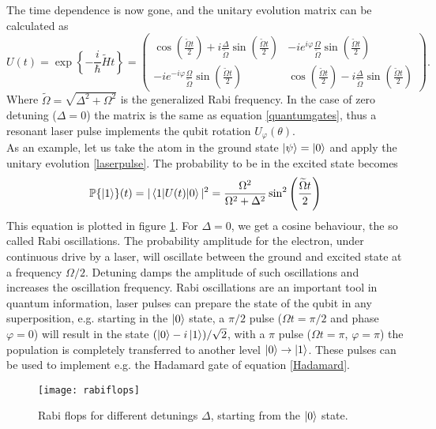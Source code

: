 The time dependence is now gone, and the unitary evolution matrix can be calculated as
\begin{equation}
\label{laserpulse}
U(t) = \exp\left\{-\frac{i}{\hbar} \widetilde{H} t \right\} =
 \begin{pmatrix}
  \cos\left(\frac{\widetilde{\Omega} t}{2}\right) + i \frac{\Delta}{\widetilde{\Omega}} \sin\left(\frac{\widetilde{\Omega} t}{2}\right) & -ie^{i\varphi}\frac{\Omega}{\widetilde{\Omega}}  \sin\left(\frac{\widetilde{\Omega} t}{2}\right) \\
  -ie^{-i\varphi}\frac{\Omega}{\widetilde{\Omega}}  \sin\left(\frac{\widetilde{\Omega} t}{2}\right)  & \cos\left(\frac{\widetilde{\Omega} t}{2}\right) - i \frac{\Delta}{\widetilde{\Omega}} \sin\left(\frac{\widetilde{\Omega} t}{2}\right)
\end{pmatrix}.
\end{equation}
Where $\widetilde{\Omega} = \sqrt{\Delta^2 + \Omega^2}$ is the generalized Rabi frequency. In the case of zero detuning ($\Delta = 0$) the matrix is the same as equation \eqref{quantumgates}, thus a resonant laser pulse implements the qubit rotation $U_{\varphi}(\theta)$.\\
As an example, let us take the atom in the ground state $\ket{\psi} = \ket{0}$ and apply the unitary evolution \eqref{laserpulse}. The probability to be in the excited state becomes
\begin{equation}
\mathbb{P}\{\ket{1}\}(t) = |\braket{1|U(t)|0}|^2 = \frac{\Omega^2}{\Omega^2+\Delta^2} \sin^2\left(\frac{\widetilde{\Omega}t}{2} \right)
\end{equation}
This equation is plotted in figure \ref{rabiflops}. For $\Delta = 0$, we get a cosine behaviour, the so called Rabi oscillations. The probability amplitude for the electron, under continuous drive by a laser, will oscillate between the ground and excited state at a frequency $\Omega/2$. Detuning damps the amplitude of such oscillations and increases the oscillation frequency. Rabi oscillations are an important tool in quantum information, laser pulses can prepare the state of the qubit in any superposition, e.g. starting in the $\ket{0}$ state, a $\pi/2$ pulse ($\Omega t = \pi/2$ and phase $\varphi=0$) will result in the state $(\ket{0} - i\ket{1})/\sqrt{2}$, with a $\pi$ pulse ($\Omega t = \pi$, $\varphi=\pi$) the population is completely transferred to another level $\ket{0}\to \ket{1}$. These pulses can be used to implement e.g. the Hadamard gate of equation \eqref{Hadamard}.
\begin{figure}[H]
\centering
\texttt{[image: rabiflops]}
\caption{Rabi flops for different detunings $\Delta$, starting from the $\ket{0}$ state.}
\label{rabiflops}
\end{figure}
